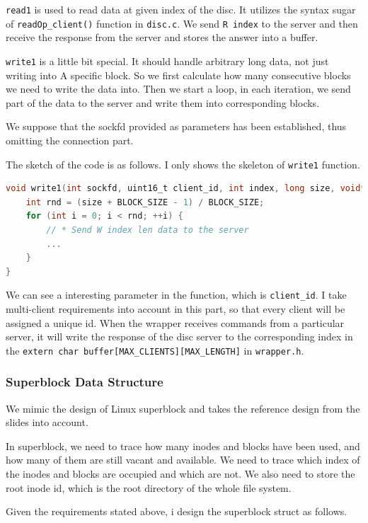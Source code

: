 \texttt{read1} is used to read data at given index of the disc. It utilizes the syntax sugar of \texttt{readOp\_client()} function in \texttt{disc.c}. We send \texttt{R index} to the server and then receive the response from the server and stores the answer into a buffer.

\texttt{write1} is a little bit special. It should handle arbitrary long data, not just writing into A specific block. So we first calculate how many consecutive blocks we need to write the data into. Then we start a loop, in each iteration, we send part of the data to the server and write them into corresponding blocks. 

We suppose that the sockfd provided as parameters has been established, thus omitting the connection part.

The sketch of the code is as follows. I only shows the skeleton of \texttt{write1} function.

\begin{lstlisting}[language=C]
void write1(int sockfd, uint16_t client_id, int index, long size, void* data) {
    int rnd = (size + BLOCK_SIZE - 1) / BLOCK_SIZE;
    for (int i = 0; i < rnd; ++i) {
        // * Send W index len data to the server
        ...
    }
}
\end{lstlisting}

We can see a interesting parameter in the function, which is \texttt{client\_id}. I take multi-client requirements into account in this part,
 so that every client will be assigned a unique id. When the wrapper receives commands from a particular server, it will write the response 
 of the disc server to the corresponding index in the \texttt{extern char buffer[MAX_CLIENTS][MAX_LENGTH]} in \texttt{wrapper.h}.

\subsubsection{Superblock Data Structure}
We mimic the design of Linux superblock and takes the reference design from the slides into account.

In superblock, we need to trace how many inodes and blocks have been used, and how many of them are still vacant and available. We 
need to trace which index of the inodes and blocks are occupied and which are not. We also need to store the root inode id, which is the root directory of the whole file system.

Given the requirements stated above, i design the superblock struct as follows.

